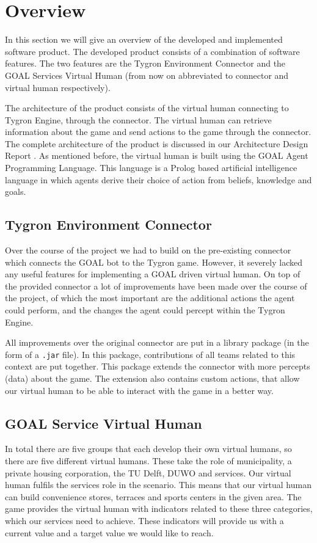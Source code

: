 \section{Overview}
In this section we will give an overview of the developed and implemented software product. The developed product consists of a combination of software features. The two features are the Tygron Environment Connector and the GOAL Services Virtual Human (from now on abbreviated to connector and virtual human respectively). 

The architecture of the product consists of the virtual human connecting to Tygron Engine, through the connector. The virtual human can retrieve information about the game and send actions to the game through the connector. The complete architecture of the product is discussed in our Architecture Design Report \cite{CTD16}. As mentioned before, the virtual human is built using the GOAL Agent Programming Language\cite{GOAL16}. This language is a Prolog based artificial intelligence language in which agents derive their choice of action from beliefs, knowledge and goals.

\subsection{Tygron Environment Connector}
Over the course of the project we had to build on the pre-existing connector which connects the GOAL bot to the Tygron game. However, it severely lacked any useful features for implementing a GOAL driven virtual human. On top of the provided connector a lot of improvements have been made over the course of the project, of which the most important are the additional actions the agent could perform, and the changes the agent could percept within the Tygron Engine. 

All improvements over the original connector are put in a library package (in the form of a \texttt{.jar} file). In this package, contributions of all teams related to this context are put together. This package extends the connector with more percepts (data) about the game. The extension also contains custom actions, that allow our virtual human to be able to interact with the game in a better way. 

\subsection{GOAL Service Virtual Human}
In total there are five groups that each develop their own virtual humans, so there are five different virtual humans. These take the role of municipality, a private housing corporation, the TU Delft, DUWO and services. Our virtual human fulfils the services role in the scenario. This means that our virtual human can build convenience stores, terraces and sports centers in the given area. The game provides the virtual human with indicators related to these three categories, which our services need to achieve. These indicators will provide us with a current value and a target value we would like to reach. 

